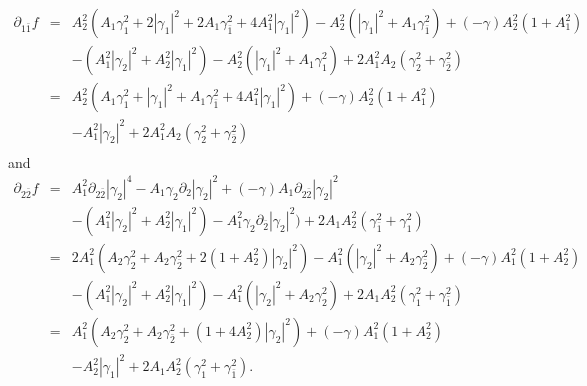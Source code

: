 \documentclass[12pt]{amsart}
\def\d{\partial}
\def\d{\partial}
\begin{document}
\begin{eqnarray*}
\d_{1\bar1}  f&=&A_2^2 ( A_1 \gamma_1^2 +2 | \gamma_1|^2 +2A_1 \gamma_{\bar1}^2 +4A_1^2|\gamma_1|^2 )
- A_2^2 (|\gamma_1|^2 +A_1 \gamma_{\bar1}^2)+(-\gamma) A_2^2 (1+A_1^2)\\
&&-(A_1^2|\gamma_2|^2
+A_2^2|\gamma_1|^2)- A_2^2 (|\gamma_1|^2 +A_1 \gamma_1 ^2)+2A_1^2A_2 ( \gamma_2^2 + \gamma_{\bar2}^2 )\\
&=&A_2^2 ( A_1 \gamma_1^2 + |\gamma_1|^2 +A_1 \gamma_{\bar1}^2 +4A_1^2|\gamma_1|^2 )
+(-\gamma) A_2^2 (1+A_1^2)\\
&&-A_1^2|\gamma_2|^2+2A_1^2A_2 ( \gamma_2^2 + \gamma_{\bar2}^2 )\\
\end{eqnarray*}
and
\begin{eqnarray*}
\d_{2\bar2} f&=&A_1^2 \d_{2\bar2} |\gamma_2|^4-A_1 \gamma_2  \d_2 |\gamma_2|^2+
 (-\gamma) A_1 \d_{2\bar 2}  |\gamma_2|^2\\
 &&- (A_1^2|\gamma_2|^2+A_2^2|\gamma_1|^2)- A_1^2 \gamma_2 \d_{\bar2} |\gamma_2|^2)
+2A_1A_2^2 (   \gamma_{\bar1} ^2+  \gamma_1^2)\\
&=&2A_1^2(A_2\gamma_2^2+A_2 \gamma_{\bar2}^2 +2(1+A_2^2) |\gamma_2|^2)
-A_1^2(|\gamma_2|^2+A_2 \gamma_{\bar2}^2)+(-\gamma)A_1^2(1+A_2^2)\\
&&-(A_1^2 |\gamma_2|^2+A_2^2|\gamma_1|^2)-A_1^2(|\gamma_2|^2+A_2 \gamma_2^2)
+2A_1A_2^2(\gamma_1^2+\gamma_{\bar1}^2)\\
&=&A_1^2(A_2\gamma_2^2+A_2 \gamma_{\bar2}^2 +(1+4A_2^2) |\gamma_2|^2)
+(-\gamma)A_1^2(1+A_2^2)\\
&&-A_2^2|\gamma_1|^2
+2A_1A_2^2(\gamma_1^2+\gamma_{\bar1}^2).
\end{eqnarray*}
\end{document}
